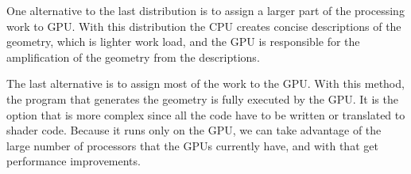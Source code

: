 One alternative to the last distribution is to assign a larger part of the processing work to \gls{GPU}. With this distribution the \gls{CPU} creates concise descriptions of the geometry, which is lighter work load, and the \gls{GPU} is responsible for the amplification of the geometry from the descriptions.

The last alternative is to assign most of the work to the \gls{GPU}. With this method, the program that generates the geometry is fully executed by the \gls{GPU}. It is the option that is more complex since all the code have to be written or translated to shader code. Because it runs only on the \gls{GPU}, we can take advantage of the large number of processors that the \gls{GPU}s currently have, and with that get performance improvements.


